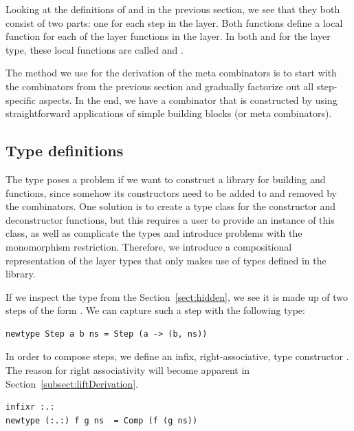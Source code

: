 \documentclass[preprint,natbib]{sigplanconf}
\begin{document}
Looking at the definitions of  and  in the previous section, we see that they both consist of two parts: one for each step in the layer. Both functions define a local function for each of the layer functions in the layer. In both  and  for the  layer type, these local functions are called  and . 

The method we use for the derivation of the meta combinators is to start with the combinators from the previous section and gradually factorize out all step-specific aspects. In the end, we have a combinator that is constructed by using straightforward applications of simple building blocks (or meta combinators). 



 
%																
\subsection{Type definitions} \label{subsecttypedef}

The  type poses a problem if we want to construct a library for building  and  functions, since somehow its constructors need to be added to and removed by the combinators. One solution is to create a type class for the constructor and deconstructor functions, but this requires a user to provide an instance of this class, as well as complicate the types and introduce problems with the monomorphism restriction. Therefore, we introduce a compositional representation of the layer types that only makes use of types defined in the library.

If we inspect the  type from the Section~\ref{sect:hidden}, we see it is made up of two steps of the form . We can capture such a step with the following type:


\begin{small}
\begin{verbatim}
newtype Step a b ns = Step (a -> (b, ns))
\end{verbatim}
\end{small}

In order to compose steps, we define an infix, right-associative, type constructor .
The reason for right associativity will become apparent in Section~\ref{subsect:liftDerivation}.

\begin{small}
\begin{verbatim}
infixr :.:
newtype (:.:) f g ns  = Comp (f (g ns))
\end{verbatim}
\end{small}
\end{document}
